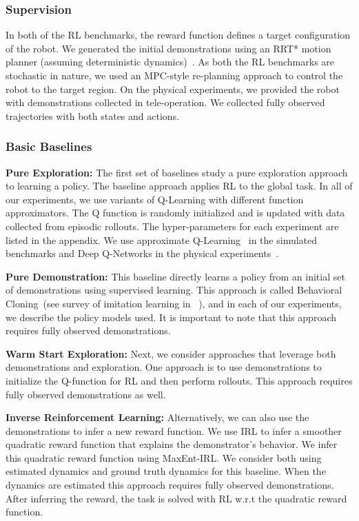 \subsubsection{Supervision}
In both of the RL benchmarks, the reward function defines a target configuration of the robot.
We generated the initial demonstrations using an RRT* motion planner (assuming deterministic dynamics)~\cite{karaman2010incremental}. As both the RL benchmarks are stochastic in nature, we used an MPC-style re-planning approach to control the robot to the target region.
On the physical experiments, we provided the robot with demonstrations collected in tele-operation. We collected fully observed trajectories with both states and actions.

\subsubsection{Basic Baselines}

\vspace{0.25em}\noindent \textbf{Pure Exploration: } The first set of baselines study a pure exploration approach to learning a policy. The baseline approach applies RL to the global task. In all of our experiments, we use variants of Q-Learning with different function approximators. The Q function is randomly initialized and is updated with data collected from episodic rollouts. The hyper-parameters for each experiment are listed in the appendix. We use approximate Q-Learning~\cite{thrun1993issues, bertsekas1995neuro} in the simulated benchmarks and Deep Q-Networks in the physical experiments~\cite{mnih2015human}.

\vspace{0.25em}\noindent \textbf{Pure Demonstration: } This baseline directly learns a policy from an initial set of demonstrations using supervised learning. This approach is called Behavioral Cloning~(see survey of imitation learning in ~\cite{osa2018algorithmic}), and in each of our experiments, we describe the policy models used.  It is important to note that this approach requires fully observed demonstrations.

\vspace{0.25em}\noindent \textbf{Warm Start Exploration: } Next, we consider approaches that leverage both demonstrations and exploration. One approach is to use demonstrations to initialize the Q-function for RL and then perform rollouts. This approach requires fully observed demonstrations as well.

\vspace{0.25em}\noindent \textbf{Inverse Reinforcement Learning: } Alternatively, we can also use the demonstrations to infer a new reward function. We use IRL to infer a smoother quadratic reward function that explains the demonstrator's behavior. We infer this quadratic reward function using MaxEnt-IRL. We consider both using estimated dynamics and ground truth dynamics for this baseline. When the dynamics are estimated this approach requires fully observed demonstrations. After inferring the reward, the task is solved with RL w.r.t the quadratic reward function.


